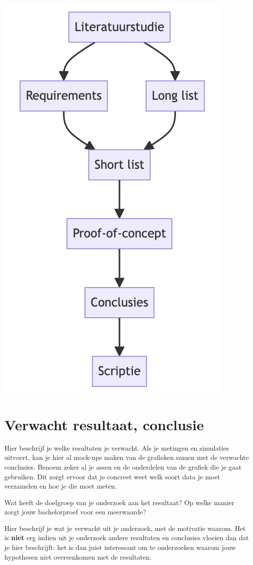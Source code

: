 \begin{center}
\includegraphics[scale=0.5]{methodologie.png}
\end{center}

\section{Verwacht resultaat, conclusie}%
\label{sec:verwachte_resultaten}

Hier beschrijf je welke resultaten je verwacht. Als je metingen en simulaties uitvoert, kan je hier al mock-ups maken van de grafieken samen met de verwachte conclusies. Benoem zeker al je assen en de onderdelen van de grafiek die je gaat gebruiken. Dit zorgt ervoor dat je concreet weet welk soort data je moet verzamelen en hoe je die moet meten.

Wat heeft de doelgroep van je onderzoek aan het resultaat? Op welke manier zorgt jouw bachelorproef voor een meerwaarde?

Hier beschrijf je wat je verwacht uit je onderzoek, met de motivatie waarom. Het is \textbf{niet} erg indien uit je onderzoek andere resultaten en conclusies vloeien dan dat je hier beschrijft: het is dan juist interessant om te onderzoeken waarom jouw hypothesen niet overeenkomen met de resultaten.

